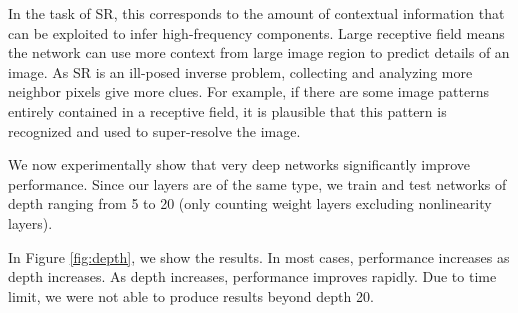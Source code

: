 \documentclass[10pt,twocolumn,letterpaper]{article}
\begin{document}
In the task of SR, this corresponds to the amount of contextual information that can be exploited to infer high-frequency components. Large receptive field means the network can use more context from large image region to predict details of an image. As SR is an ill-posed inverse problem, collecting and analyzing more neighbor pixels give more clues. For example, if there are some image patterns entirely contained in a receptive field, it is plausible that this pattern is recognized and used to super-resolve the image. 

We now experimentally show that very deep networks significantly improve performance.  Since our layers are of the same type, we train and test networks of depth ranging from 5 to 20 (only counting weight layers excluding nonlinearity layers). 

In Figure \ref{fig:depth}, we show the results. In most cases, performance increases as depth increases. As depth increases, performance improves rapidly. Due to time limit, we were not able to produce results beyond depth 20. 
\end{document}
